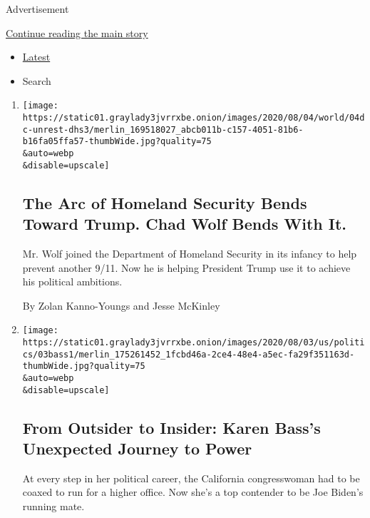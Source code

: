 Advertisement

\protect\hyperlink{after-mid1}{Continue reading the main story}

\begin{itemize}
\tightlist
\item
  \protect\hyperlink{stream-panel}{Latest}
\item
  Search
\end{itemize}

\begin{enumerate}
\def\labelenumi{\arabic{enumi}.}
\item
  \href{/2020/08/04/us/politics/trump-homeland-security.html}{}

  \texttt{[image: https://static01.graylady3jvrrxbe.onion/images/2020/08/04/world/04dc-unrest-dhs3/merlin\_169518027\_abcb011b-c157-4051-81b6-b16fa05ffa57-thumbWide.jpg?quality=75\\\&auto=webp\\\&disable=upscale]}

  \hypertarget{the-arc-of-homeland-security-bends-toward-trump-chad-wolf-bends-with-it}{%
  \subsection{The Arc of Homeland Security Bends Toward Trump. Chad Wolf
  Bends With
  It.}\label{the-arc-of-homeland-security-bends-toward-trump-chad-wolf-bends-with-it}}

  Mr. Wolf joined the Department of Homeland Security in its infancy to
  help prevent another 9/11. Now he is helping President Trump use it to
  achieve his political ambitions.

  By Zolan Kanno-Youngs and Jesse McKinley
\item
  \href{/2020/08/04/us/politics/karen-bass-vice-president-biden.html}{}

  \texttt{[image: https://static01.graylady3jvrrxbe.onion/images/2020/08/03/us/politics/03bass1/merlin\_175261452\_1fcbd46a-2ce4-48e4-a5ec-fa29f351163d-thumbWide.jpg?quality=75\\\&auto=webp\\\&disable=upscale]}

  \hypertarget{from-outsider-to-insider-karen-basss-unexpected-journey-to-power}{%
  \subsection{From Outsider to Insider: Karen Bass's Unexpected Journey
  to
  Power}\label{from-outsider-to-insider-karen-basss-unexpected-journey-to-power}}

  At every step in her political career, the California congresswoman
  had to be coaxed to run for a higher office. Now she's a top contender
  to be Joe Biden's running mate.


\end{enumerate}
